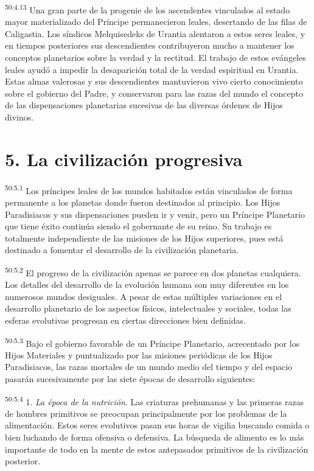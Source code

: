 \par
\textsuperscript{50:4.13} Una gran parte de la progenie de los ascendentes vinculados al estado mayor materializado del Príncipe permanecieron leales, desertando de las filas de Caligastia. Los síndicos Melquisedeks de Urantia alentaron a estos seres leales, y en tiempos posteriores sus descendientes contribuyeron mucho a mantener los conceptos planetarios sobre la verdad y la rectitud. El trabajo de estos evángeles leales ayudó a impedir la desaparición total de la verdad espiritual en Urantia. Estas almas valerosas y sus descendientes mantuvieron vivo cierto conocimiento sobre el gobierno del Padre, y conservaron para las razas del mundo el concepto de las dispensaciones planetarias sucesivas de las diversas órdenes de Hijos divinos.

\section*{5. La civilización progresiva}
\par
\textsuperscript{50:5.1} Los príncipes leales de los mundos habitados están vinculados de forma permanente a los planetas donde fueron destinados al principio. Los Hijos Paradisiacos y sus dispensaciones pueden ir y venir, pero un Príncipe Planetario que tiene éxito continúa siendo el gobernante de su reino. Su trabajo es totalmente independiente de las misiones de los Hijos superiores, pues está destinado a fomentar el desarrollo de la civilización planetaria.

\par
\textsuperscript{50:5.2} El progreso de la civilización apenas se parece en dos planetas cualquiera. Los detalles del desarrollo de la evolución humana son muy diferentes en los numerosos mundos desiguales. A pesar de estas múltiples variaciones en el desarrollo planetario de los aspectos físicos, intelectuales y sociales, todas las esferas evolutivas progresan en ciertas direcciones bien definidas.

\par
\textsuperscript{50:5.3} Bajo el gobierno favorable de un Príncipe Planetario, acrecentado por los Hijos Materiales y puntualizado por las misiones periódicas de los Hijos Paradisiacos, las razas mortales de un mundo medio del tiempo y del espacio pasarán sucesivamente por las siete épocas de desarrollo siguientes:

\par
\textsuperscript{50:5.4} 1. \textit{La época de la nutrición}. Las criaturas prehumanas y las primeras razas de hombres primitivos se preocupan principalmente por los problemas de la alimentación. Estos seres evolutivos pasan sus horas de vigilia buscando comida o bien luchando de forma ofensiva o defensiva. La búsqueda de alimento es lo más importante de todo en la mente de estos antepasados primitivos de la civilización posterior.


